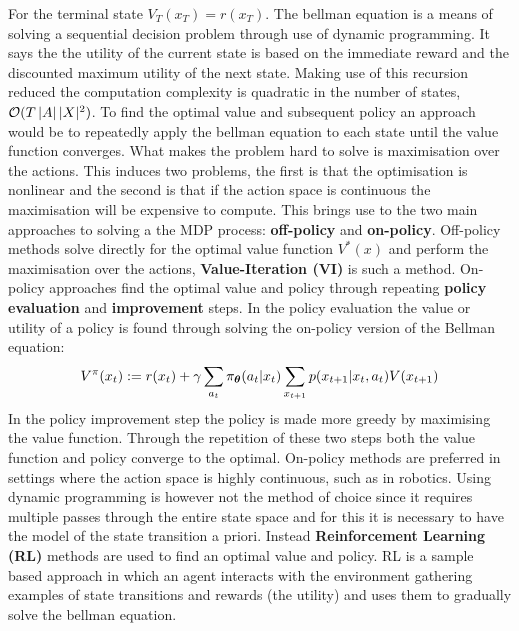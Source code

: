 For the terminal state $V_T(x_T) = r(x_T)$. The bellman equation is a means of solving a sequential decision problem 
through use of dynamic programming. It says the the utility of the current state is based on the immediate reward and 
the discounted maximum utility of the next state. Making use of this recursion reduced the computation complexity is 
quadratic in the number of states, $\operatorname{\mathcal{O}}(T\, |A|\, |X|^2)$. To find the optimal value and subsequent policy an approach 
would be to repeatedly apply the bellman equation to each state until the value function converges. What makes the problem 
hard to solve is maximisation over the actions. This induces two problems, the first is that the optimisation is nonlinear 
and the second is that if the action space is continuous the maximisation will be expensive to compute.
This brings use to the two main approaches to solving a the MDP process: \textbf{off-policy} and \textbf{on-policy}.
Off-policy methods solve directly for the optimal value function $V^*(x)$ and perform the maximisation over the actions, \textbf{Value-Iteration (VI)}
is such a method. On-policy approaches find the optimal value and policy through repeating \textbf{policy evaluation} and
\textbf{improvement} steps. In the policy evaluation the value or utility of a policy is found through solving the on-policy version of the Bellman 
equation:
\begin{equation}\label{eq:on_policy_bellman}
  V^{\pi}(x_t) := r(x_t) + \gamma \sum\limits_{a_t} \operatorname{\pi_{\boldsymbol{\theta}}}(a_t|x_t) \sum\limits_{x_{t+1}} p(x_{t+1}|x_t,a_t) V(x_{t+1})
\end{equation}
In the policy improvement step the policy is made more greedy by maximising the value function. Through the repetition of these two 
steps both the value function and policy converge to the optimal. On-policy methods are preferred in settings where the action 
space is highly continuous, such as in robotics. Using dynamic programming is however not the method of choice since it requires 
multiple passes through the entire state space and for this it is necessary to have the model of the state transition a priori. 
Instead \textbf{Reinforcement Learning (RL)} methods are used to find an optimal value and policy. RL is a sample based approach
in which an agent interacts with the environment gathering examples of state transitions and rewards (the utility) and uses them 
to gradually solve the bellman equation.

